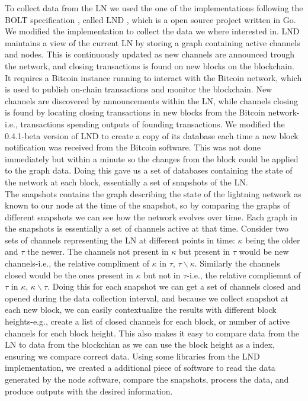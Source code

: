 To collect data from the LN we used the one of the implementations following the BOLT specification \cite{bolt}, called LND \cite{lnd}, which is a open source project written in Go. We modified the implementation to collect the data we where interested in. LND maintains a view of the current LN by storing a graph containing active channels and nodes. This is continuously updated as new channels are announced trough the network, and closing transactions is found on new blocks on the blockchain. It requires a Bitcoin instance running to interact with the Bitcoin network, which is used to publish on-chain transactions and monitor the blockchain. New channels are discovered by announcements within the LN, while channels closing is found by locating closing transactions in new blocks from the Bitcoin network-i.e., transactions spending outputs of founding transactions. 
We modified the 0.4.1-beta version of LND to create a copy of its database each time a new block notification was received from the Bitcoin software. This was not done immediately but within a minute so the changes from the block could be applied to the graph data. Doing this gave us a set of databases containing the state of the network at each block, essentially a set of snapshots of the LN.
\\


The snapshots contains the graph describing the state of the lightning network as known to our node at the time of the snapshot, so by comparing the graphs of different snapshots we can see how the network evolves over time. 
Each graph in the snapshots is essentially a set of channels active at that time. Consider two sets of channels representing the LN at different points in time: \(\kappa\) being the older and \(\tau\) the newer. The channels not present in \(\kappa\) but present in \(\tau\) would be new channels-i.e., the relative compliment of \(\kappa\) in \(\tau\), \( \tau \backslash{}\kappa\). Similarly the channels closed would be the ones present in \(\kappa\) but not in \(\tau\)-i.e., the relative compliemnt of \(\tau\) in \(\kappa\), \(\kappa\backslash{}\tau\). Doing this for each snapshot we can get a set of channels closed and opened during the data collection interval, and because we collect snapshot at each new block, we can easily contextualize the results with different block heights-e.g., create a list of closed channels for each block, or number of active channels for each block height. This also makes it easy to compare data from the LN to data from the blockchian as we can use the block height as a index, ensuring we compare correct data.
Using some libraries from the LND implementation, we created a additional piece of software to read the data generated by the node software, compare the snapshots, process the data, and produce outputs with the desired information.
\\

